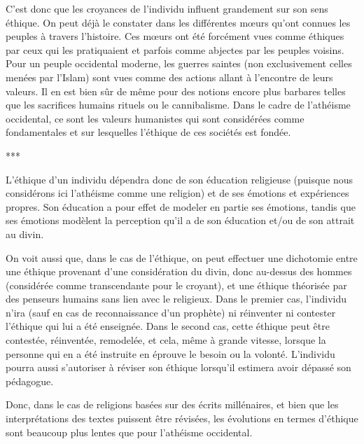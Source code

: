 C’est donc que les croyances de l’individu influent grandement sur son sens éthique. On peut déjà le constater dans les différentes mœurs qu'ont connues les peuples à travers l’histoire. Ces mœurs ont été forcément vues comme éthiques par ceux qui les pratiquaient et parfois comme abjectes par les peuples voisins. Pour un peuple occidental moderne, les guerres saintes (non exclusivement celles menées par l’Islam) sont vues comme des actions allant à l’encontre de leurs valeurs. Il en est bien sûr de même pour des notions encore plus barbares telles que les sacrifices humains rituels ou le cannibalisme. Dans le cadre de l'athéisme occidental, ce sont les valeurs humanistes qui sont considérées comme fondamentales et sur lesquelles l'éthique de ces sociétés est fondée.

\begin{center}
***
\end{center}

L’éthique d’un individu dépendra donc de son éducation religieuse (puisque nous considérons ici l'athéisme comme une religion) et de ses émotions et expériences propres. Son éducation a pour effet de modeler en partie ses émotions, tandis que ses émotions modèlent la perception qu’il a de son éducation et/ou de son attrait au divin.

On voit aussi que, dans le cas de l’éthique, on peut effectuer une dichotomie entre une éthique provenant d’une considération du divin, donc au-dessus des hommes (considérée comme transcendante pour le croyant), et une éthique théorisée par des penseurs humains sans lien avec le religieux. Dans le premier cas, l’individu n’ira (sauf en cas de reconnaissance d’un prophète) ni réinventer ni contester l’éthique qui lui a été enseignée. Dans le second cas, cette éthique peut être contestée, réinventée, remodelée, et cela, même à grande vitesse, lorsque la personne qui en a été instruite en éprouve le besoin ou la volonté. L’individu pourra aussi s’autoriser à réviser son éthique lorsqu’il estimera avoir dépassé son pédagogue.

Donc, dans le cas de religions basées sur des écrits millénaires, et bien que les interprétations des textes puissent être révisées, les évolutions en termes d'éthique sont beaucoup plus lentes que pour l'athéisme occidental.

